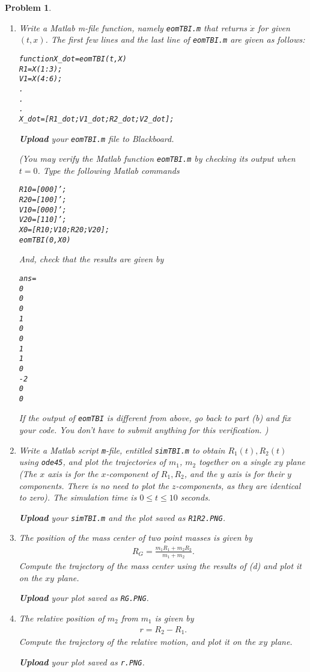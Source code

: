 \documentclass[10pt]{article}
\renewcommand{\baselinestretch}{1.2}
\theoremstyle{plain}\theorembodyfont{\normalfont}
\newtheorem{prob}{Problem}[section]
\newenvironment{subprob}%
{\renewcommand{\theenumi}{\alph{enumi}}\renewcommand{\labelenumi}{(\theenumi)}\begin{enumerate}}%
{\end{enumerate}}%
\newenvironment{matlab}
{\begin{alltt}\small\renewcommand{\baselinestretch}{1.2}\selectfont}%
{\end{alltt}}
\begin{document}
\begin{prob}
\begin{subprob}
\item Write a Matlab m-file function, namely \texttt{eomTBI.m} that returns $\dot x$ for given $(t,x)$. The first few lines and the last line of \texttt{eomTBI.m} are given as follows:
\begin{matlab}
function X_dot = eomTBI(t,X)
R1=X(1:3);
V1=X(4:6);
.
.
.
X_dot = [R1_dot; V1_dot; R2_dot; V2_dot];
\end{matlab}
\textbf{Upload} your \texttt{eomTBI.m} file to Blackboard.

(You may verify the Matlab function \texttt{eomTBI.m} by checking its output when $t=0$. Type the following Matlab commands
\begin{matlab}
R10=[0 0 0]';
R20=[1 0 0]';
V10=[0 0 0]';
V20=[1 1 0]';
X0=[R10; V10; R20; V20];
eomTBI(0,X0)
\end{matlab}
And, check that the results are given by
\begin{matlab}
ans =
     0
     0
     0
     1
     0
     0
     1
     1
     0
    -2
     0
     0
\end{matlab}
If the output of \texttt{eomTBI} is different from above, go back to part (b) and fix your code. You don't have to submit anything for this verification. )

\item Write a Matlab script \texttt{m}-file, entitled \texttt{simTBI.m} to obtain $R_1(t), R_2(t)$ using \texttt{ode45}, and plot the trajectories of $m_1$, $m_2$ together on a single $xy$ plane (The $x$ axis is for the $x$-component of $R_1,R_2$, and the $y$ axis is for their $y$ components. There is no need to plot the $z$-components, as they are identical to zero). The simulation time is $0\leq t \leq 10$ seconds.

\textbf{Upload} your \texttt{simTBI.m} and the plot saved as \texttt{R1R2.PNG}.


\item The position of the mass center of two point masses is given by
\begin{align*}
 R_G = \frac{m_1  R_1 + m_2  R_2}{m_1+m_2}.
\end{align*}
Compute the trajectory of the mass center using the results of (d) and plot it on the $xy$ plane.

\textbf{Upload} your plot saved as \texttt{RG.PNG}.

\item The relative position of $m_2$ from $m_1$ is given by
\begin{align*}
 r =  R_2 - R_1.
\end{align*}
Compute the trajectory of the relative motion, and plot it on the $xy$ plane.

\textbf{Upload} your plot saved as \texttt{r.PNG}.
\end{subprob}
\end{prob}
\end{document}
